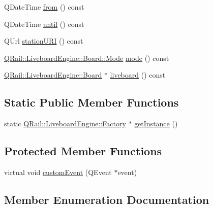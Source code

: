 \begin{DoxyCompactItemize}
\item 
Q\+Date\+Time \mbox{\hyperlink{classQRail_1_1LiveboardEngine_1_1Factory_a883b4e0b9af113d312c6828b64d07258}{from}} () const
\item 
Q\+Date\+Time \mbox{\hyperlink{classQRail_1_1LiveboardEngine_1_1Factory_a040529d305e2cc4d19b68f48817f7a90}{until}} () const
\item 
Q\+Url \mbox{\hyperlink{classQRail_1_1LiveboardEngine_1_1Factory_aad0820a9d150f8adb8599cf5be4855d0}{station\+U\+RI}} () const
\item 
\mbox{\hyperlink{classQRail_1_1LiveboardEngine_1_1Board_a0ab6d318f405895f62c6e98cb2d86c6e}{Q\+Rail\+::\+Liveboard\+Engine\+::\+Board\+::\+Mode}} \mbox{\hyperlink{classQRail_1_1LiveboardEngine_1_1Factory_a03deeb607999848d402a5a3af40967f4}{mode}} () const
\item 
\mbox{\hyperlink{classQRail_1_1LiveboardEngine_1_1Board}{Q\+Rail\+::\+Liveboard\+Engine\+::\+Board}} $\ast$ \mbox{\hyperlink{classQRail_1_1LiveboardEngine_1_1Factory_a6534f49a21cd36099bd2bdece775e8cc}{liveboard}} () const
\end{DoxyCompactItemize}
\subsection*{Static Public Member Functions}
\begin{DoxyCompactItemize}
\item 
static \mbox{\hyperlink{classQRail_1_1LiveboardEngine_1_1Factory}{Q\+Rail\+::\+Liveboard\+Engine\+::\+Factory}} $\ast$ \mbox{\hyperlink{classQRail_1_1LiveboardEngine_1_1Factory_a08e37a6538aad6341edf7066f10a63c7}{get\+Instance}} ()
\end{DoxyCompactItemize}
\subsection*{Protected Member Functions}
\begin{DoxyCompactItemize}
\item 
virtual void \mbox{\hyperlink{classQRail_1_1LiveboardEngine_1_1Factory_a214c37703d996797de42151ec41f55b2}{custom\+Event}} (Q\+Event $\ast$event)
\end{DoxyCompactItemize}


\subsection{Member Enumeration Documentation}
\mbox{\label{classQRail_1_1LiveboardEngine_1_1Factory_a48dd4397653344eb07eb3212c2a188ba}} 

